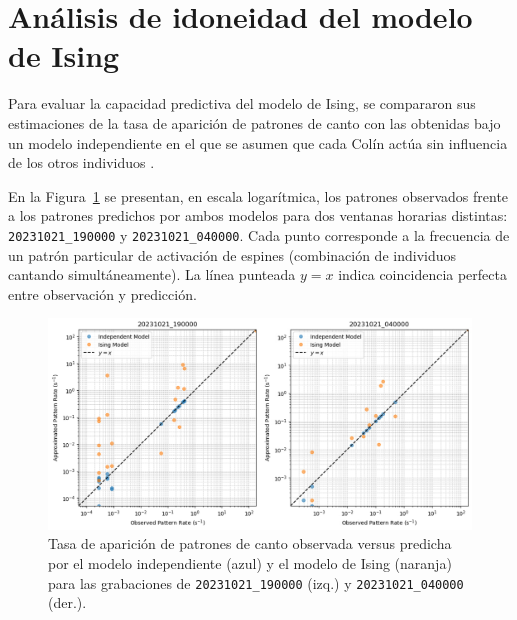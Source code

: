 \section{Análisis de idoneidad del modelo de Ising}
\label{sec:res_idoneidad}


Para evaluar la capacidad predictiva del modelo de Ising, se 
compararon sus estimaciones de la tasa de aparición de patrones 
de canto con las obtenidas bajo un modelo independiente en el 
que se asumen que cada Colín actúa sin influencia de los otros individuos 
\cite{schneidman2006weak}.

En la Figura~\ref{fig:ising_vs_indep} se presentan, en escala logarítmica, 
los patrones observados frente a los patrones predichos por 
ambos modelos para dos ventanas horarias distintas: \texttt{20231021\_190000}
y \texttt{20231021\_040000}. Cada punto corresponde a la frecuencia de un patrón 
particular de activación de espines (combinación de individuos 
cantando simultáneamente). La línea punteada \(y=x\) indica 
coincidencia perfecta entre observación y predicción.

\begin{figure}[ht]
    \centering
    \includegraphics[width=\columnwidth]{Graphics/isingvsindependent.png}
    \caption{Tasa de aparición de patrones de canto observada versus predicha por el modelo independiente (azul) y el modelo de Ising (naranja) para las grabaciones de \texttt{20231021\_190000} (izq.) y \texttt{20231021\_040000} (der.).}
    \label{fig:ising_vs_indep}
\end{figure}

